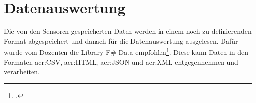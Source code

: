 \section{Datenauswertung}
Die von den Sensoren gespeicherten Daten werden in einem noch zu definierenden Format abgespeichert und danach für die Datenauswertung ausgelesen. Dafür wurde vom Dozenten die Library F\# Data empfohlen\footcite{Fsharp_Data_2016-04-24}. Diese kann Daten in den Formaten \gls{acr:CSV}, \gls{acr:HTML}, \gls{acr:JSON} und \gls{acr:XML} entgegennehmen und verarbeiten.

